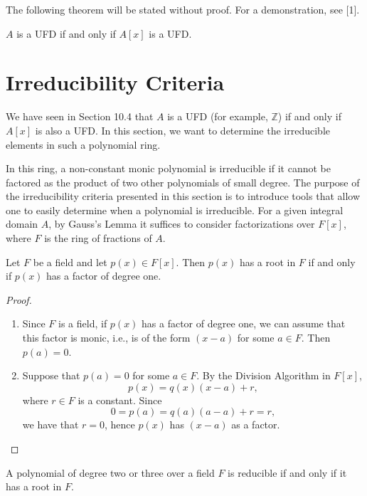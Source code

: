 \documentclass[11pt,a4paper]{article}
\begin{document}
The following theorem will be stated without proof. For a demonstration, see [1].

\begin{teo}[10.3]
$A$ is a UFD if and only if $A[x]$ is a UFD.
\end{teo}
    
\section{Irreducibility Criteria}

We have seen in Section 10.4 that $A$ is a UFD (for example, $\mathbb{Z}$) if and only if $A[x]$ is also a UFD. In this section, we want to determine the irreducible elements in such a polynomial ring.

In this ring, a non-constant monic polynomial is irreducible if it cannot be factored as the product of two other polynomials of small degree. The purpose of the irreducibility criteria presented in this section is to introduce tools that allow one to easily determine when a polynomial is irreducible. For a given integral domain $A$, by Gauss's Lemma it suffices to consider factorizations over $F[x]$, where $F$ is the ring of fractions of $A$.

\begin{prop}[10.7]
Let $F$ be a field and let $p(x) \in F[x]$. Then $p(x)$ has a root in $F$ if and only if $p(x)$ has a factor of degree one.
\end{prop}

\begin{proof}
\begin{enumerate}[label=(\roman*)]
    \item Since $F$ is a field, if $p(x)$ has a factor of degree one, we can assume that this factor is monic, i.e., is of the form $(x - a)$ for some $a \in F$. Then $p(a) = 0$.
    \item Suppose that $p(a) = 0$ for some $a \in F$. By the Division Algorithm in $F[x]$,
    \[
    p(x) = q(x)(x - a) + r,
    \]
    where $r \in F$ is a constant. Since
    \[
    0 = p(a) = q(a)(a - a) + r = r,
    \]
    we have that $r = 0$, hence $p(x)$ has $(x - a)$ as a factor.
\end{enumerate}
\end{proof}

\begin{prop}
A polynomial of degree two or three over a field $F$ is reducible if and only if it has a root in $F$.
\end{prop}
\end{document}
